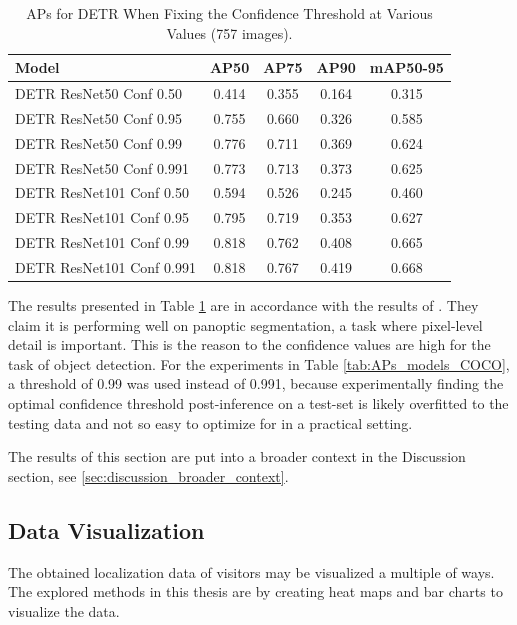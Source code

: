 \begin{table}[H]
    \centering
    \renewcommand{\arraystretch}{1.5}
    \setlength{\tabcolsep}{1em}
    \begin{tabular}{|l|c|c|c|c|}
        \hline
        \rowcolor{gray!25}
        \textbf{Model} & \textbf{AP50} & \textbf{AP75} & \textbf{AP90} & \textbf{mAP50-95} \\ \hline
        DETR ResNet50 Conf  0.50             & 0.414 & 0.355 & 0.164 & 0.315 \\ \hline
        DETR ResNet50 Conf  0.95             & 0.755 & 0.660 & 0.326 & 0.585 \\ \hline
        DETR ResNet50 Conf  0.99             & 0.776 & 0.711 & 0.369 & 0.624 \\ \hline
        DETR ResNet50 Conf  0.991            & 0.773 & 0.713 & 0.373 & 0.625 \\ \hline
        DETR ResNet101 Conf 0.50             & 0.594 & 0.526 & 0.245 & 0.460 \\ \hline
        DETR ResNet101 Conf 0.95             & 0.795 & 0.719 & 0.353 & 0.627 \\ \hline
        DETR ResNet101 Conf 0.99             & 0.818 & 0.762 & 0.408 & 0.665 \\ \hline
        DETR ResNet101 Conf 0.991            & 0.818 & 0.767 & 0.419 & 0.668 \\ \hline
    \end{tabular}
    \caption{APs for DETR When Fixing the Confidence Threshold at Various Values (757 images).}
    \label{tab:DETR_conf}
\end{table}

The results presented in Table \ref{tab:DETR_conf} are in accordance with the results of \citeauthor{carion2020endtoend}. They claim it is performing well on panoptic segmentation, a task where pixel-level detail is important. This is the reason to the confidence values are high for the task of object detection. For the experiments in Table \ref{tab:APs_models_COCO}, a threshold of 0.99 was used instead of 0.991, because experimentally finding the optimal confidence threshold post-inference on a test-set is likely overfitted to the testing data and not so easy to optimize for in a practical setting.

The results of this section are put into a broader context in the Discussion section, see \ref{sec:discussion_broader_context}.

\subsection{Data Visualization}
\label{sec:data_visualization}
The obtained localization data of visitors may be visualized a multiple of ways. The explored methods in this thesis are by creating heat maps and bar charts to visualize the data. 

